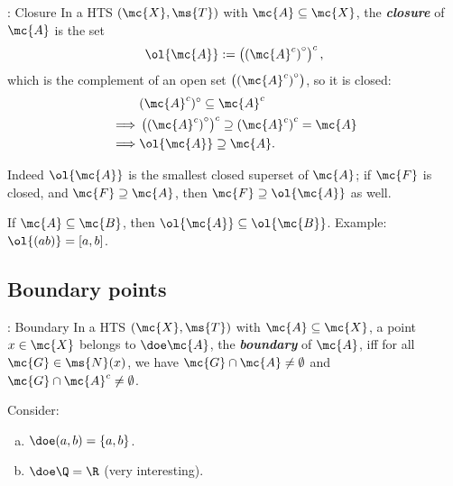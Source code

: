 \begin{ndef}{: Closure}
	In a HTS \((\mc{X},\ms{T})\) with \(\mc{A}\subseteq\mc{X}\), the \emph{\textbf{closure}} of \(\mc{A}\) is the set 
	\begin{equation*}
		\ol{\mc{A}}:=\left(\left(\mc{A}^c\right)^{\circ}\right)^c,
	\end{equation*}
	which is the complement of an open set \(\left(\left(\mc{A}^c\right)^{\circ}\right)\), so it is closed:
	\begin{align*}
		&(\mc{A}^c)^{\circ}\subseteq\mc{A}^c\\
		\implies &\left(\left(\mc{A}^c\right)^{\circ}\right)^c\supseteq \left(\mc{A}^c\right)^c=\mc{A}\\
		\implies& \ol{\mc{A}}\supseteq\mc{A}.
	\end{align*}
\end{ndef}
Indeed \(\ol{\mc{A}}\) is the smallest closed superset of \(\mc{A}\); if \(\mc{F}\) is closed, and \(\mc{F}\supseteq\mc{A}\), then \(\mc{F}\supseteq\ol{\mc{A}}\) as well.
\begin{note}
	If \(\mc{A}\subseteq\mc{B}\), then \(\ol{\mc{A}}\subseteq\ol{\mc{B}}\). Example: \(\ol{(ab)}=[a,b]\).
\end{note}

\subsection{Boundary points}
\begin{ndef}{: Boundary}
	In a HTS \((\mc{X},\ms{T})\) with \(\mc{A}\subseteq\mc{X}\), a point \(x\in\mc{X}\) belongs to \(\doe\mc{A}\), the \emph{\textbf{boundary}} of \(\mc{A}\), iff for all \(\mc{G}\in\ms{N}(x)\), we have \(\mc{G}\cap\mc{A}\neq\emptyset\) and \(\mc{G}\cap\mc{A}^c\neq\emptyset\).
\end{ndef}
\begin{example}
	Consider:
	\begin{enumerate}[(a)]
		\item \(\doe(a,b)=\{a,b\}\).
		
		\item \(\doe\Q=\R\) (very interesting).
	\end{enumerate}
\end{example}